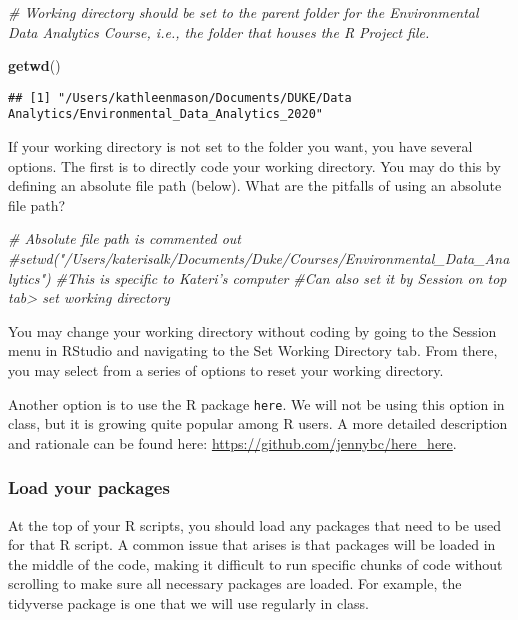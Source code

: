 \documentclass[]{article}
\newenvironment{Shaded}{\begin{snugshade}}{\end{snugshade}}
\newcommand{\CommentTok}[1]{\textcolor[rgb]{0.56,0.35,0.01}{\textit{#1}}}
\newcommand{\KeywordTok}[1]{\textcolor[rgb]{0.13,0.29,0.53}{\textbf{#1}}}
\newcommand{\NormalTok}[1]{#1}
\begin{document}
\begin{Shaded}
\begin{Highlighting}[]
\CommentTok{# Working directory should be set to the parent folder for the Environmental Data Analytics Course, i.e., the folder that houses the R Project file.}

\KeywordTok{getwd}\NormalTok{()}
\end{Highlighting}
\end{Shaded}

\begin{verbatim}
## [1] "/Users/kathleenmason/Documents/DUKE/Data Analytics/Environmental_Data_Analytics_2020"
\end{verbatim}

If your working directory is not set to the folder you want, you have
several options. The first is to directly code your working directory.
You may do this by defining an absolute file path (below). What are the
pitfalls of using an absolute file path?

\begin{Shaded}
\begin{Highlighting}[]
\CommentTok{# Absolute file path is commented out}
\CommentTok{#setwd("/Users/katerisalk/Documents/Duke/Courses/Environmental_Data_Analytics")}
\CommentTok{#This is specific to Kateri's computer}
\CommentTok{#Can also set it by Session on top tab> set working directory}
\end{Highlighting}
\end{Shaded}

You may change your working directory without coding by going to the
Session menu in RStudio and navigating to the Set Working Directory tab.
From there, you may select from a series of options to reset your
working directory.

Another option is to use the R package \texttt{here}. We will not be
using this option in class, but it is growing quite popular among R
users. A more detailed description and rationale can be found here:
\url{https://github.com/jennybc/here_here}.

\hypertarget{load-your-packages}{%
\subsubsection{Load your packages}\label{load-your-packages}}

At the top of your R scripts, you should load any packages that need to
be used for that R script. A common issue that arises is that packages
will be loaded in the middle of the code, making it difficult to run
specific chunks of code without scrolling to make sure all necessary
packages are loaded. For example, the tidyverse package is one that we
will use regularly in class.
\end{document}
